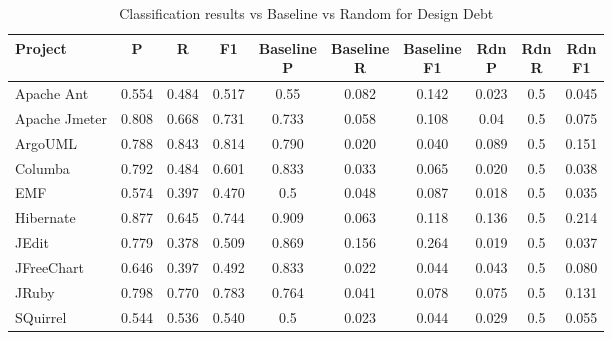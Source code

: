 \begin{table}[!hbt]
    \begin{center}
        \caption{Classification results vs Baseline vs Random for Design Debt}
        \label{tbl:classifier_results_vs_baseline_design}
        \begin{tabular}{l| c c c c c c c c c}
        \toprule
        \textbf{Project} & \textbf{P} & \textbf{R} & \textbf{F1} & \thead{Baseline\\P} & \thead{Baseline\\R} & \thead{Baseline\\F1} & \thead{Rdn\\P} & \thead{Rdn\\R} & \thead{Rdn\\F1} \\
        \midrule
        Apache Ant    &  0.554   &  0.484  &  0.517  & 0.55    & 0.082  & 0.142  &  0.023 &  0.5 &  0.045  \\
        Apache Jmeter &  0.808   &  0.668  &  0.731  & 0.733   & 0.058  & 0.108  &  0.04  &  0.5 &  0.075  \\
        ArgoUML       &  0.788   &  0.843  &  0.814  & 0.790   & 0.020  & 0.040  &  0.089 &  0.5 &  0.151  \\
        Columba       &  0.792   &  0.484  &  0.601  & 0.833   & 0.033  & 0.065  &  0.020 &  0.5 &  0.038  \\
        EMF           &  0.574   &  0.397  &  0.470  & 0.5     & 0.048  & 0.087  &  0.018 &  0.5 &  0.035  \\
        Hibernate     &  0.877   &  0.645  &  0.744  & 0.909   & 0.063  & 0.118  &  0.136 &  0.5 &  0.214  \\
        JEdit         &  0.779   &  0.378  &  0.509  & 0.869   & 0.156  & 0.264  &  0.019 &  0.5 &  0.037  \\
        JFreeChart    &  0.646   &  0.397  &  0.492  & 0.833   & 0.022  & 0.044  &  0.043 &  0.5 &  0.080  \\
        JRuby         &  0.798   &  0.770  &  0.783  & 0.764   & 0.041  & 0.078  &  0.075 &  0.5 &  0.131  \\
        SQuirrel      &  0.544   &  0.536  &  0.540  & 0.5     & 0.023  & 0.044  &  0.029 &  0.5 &  0.055  \\
        \bottomrule
        \end{tabular}
    \end{center}    
\end{table}



